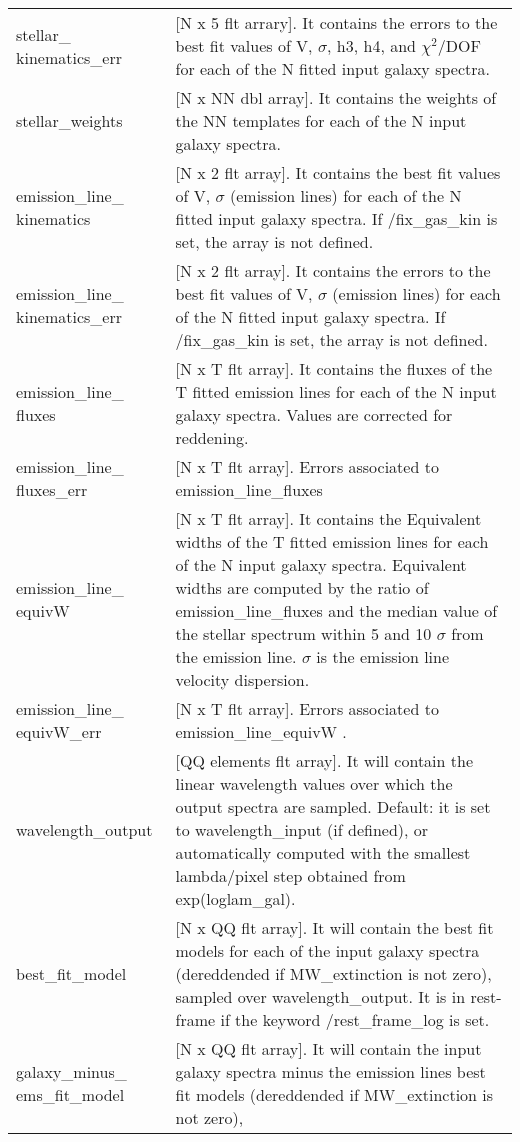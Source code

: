 \documentclass[11pt]{book}
\begin{document}
\begin{center}
\begin{longtable}{p{2.7cm}| p{11.1cm}}
  stellar\_ kinematics\_err &[N x 5 flt arrary].  It contains the errors to the best fit values of V, $\sigma$, h3, h4, and $\chi^2$/DOF for each of the N fitted input galaxy spectra.\\
  stellar\_weights        &[N x NN dbl array]. It contains the weights of the NN templates for each of the N input galaxy spectra.\\
  emission\_line\_ kinematics &[N x 2 flt array].  It contains the best fit values of V, $\sigma$ (emission lines) for each of the N fitted
                            input galaxy spectra. If /fix\_gas\_kin is set, the array is not defined.\\
 emission\_line\_ kinematics\_err & [N x 2 flt array].  It contains the errors to the best fit values of V, $\sigma$ (emission lines) for each of the N fitted input galaxy spectra. If /fix\_gas\_kin is set, the array is not defined.\\
 emission\_line\_ fluxes  &[N x T flt array].  It contains the fluxes of the T fitted emission lines for each of the N input galaxy spectra. Values are corrected for reddening.\\
%
 emission\_line\_ fluxes\_err &  [N x T flt array].  Errors associated to emission\_line\_fluxes \\
%
 emission\_line\_ equivW      & [N x T flt array]. It contains the Equivalent widths of the T fitted emission lines for each of the N input galaxy spectra.                            Equivalent widths are computed by the ratio of emission\_line\_fluxes and the median value of the stellar spectrum within 5 and 10 $\sigma$ from the emission line. $\sigma$ is the emission line velocity dispersion. \\
%
 emission\_line\_ equivW\_err  & [N x T flt array]. Errors associated to emission\_line\_equivW  . \\
%
 wavelength\_output     & [QQ elements flt array]. It will contain the linear wavelength values over which the output spectra are sampled. 
       Default: it is set to wavelength\_input (if defined), or automatically computed with the smallest lambda/pixel step obtained  from exp(loglam\_gal).\\
%
 best\_fit\_model      &[N x QQ flt array]. It will contain the best fit models for each of the input galaxy spectra (dereddended if 
                       MW\_extinction is not zero), sampled over wavelength\_output. It is in rest-frame if the keyword /rest\_frame\_log is set. \\
%
 galaxy\_minus\_ ems\_fit\_model &[N x QQ flt array]. It will contain the input galaxy spectra minus the emission lines best fit models (dereddended if MW\_extinction is not zero), 

\end{longtable}
\end{center}
\end{document}
